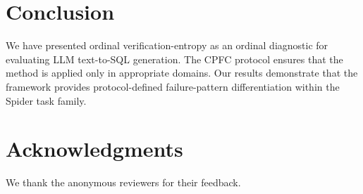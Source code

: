 \documentclass[11pt]{article}
\begin{document}
\section{Conclusion}
We have presented ordinal verification-entropy as an ordinal diagnostic for evaluating LLM text-to-SQL generation. The CPFC protocol ensures that the method is applied only in appropriate domains. Our results demonstrate that the framework provides protocol-defined failure-pattern differentiation within the Spider task family.

\section*{Acknowledgments}
We thank the anonymous reviewers for their feedback.
\end{document}
